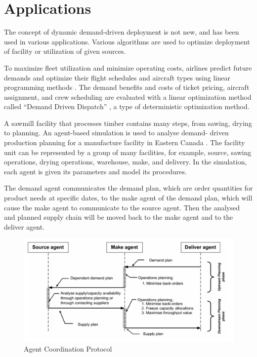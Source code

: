 \section{Applications}
The concept of dynamic demand-driven deployment is not new,
and has been used in various applications. Various algorithms
are used to optimize deployment of facility or utilization
of given sources.

To maximize fleet utilization and minimize
operating costs, airlines predict future demands
and optimize their flight schedules and aircraft
types using linear programming methods \cite{berge_demand_1993}. The demand
benefits and costs of ticket pricing, aircraft assignment, and crew 
scheduling are evaluated with a linear optimization method called
 ``Demand Driven Dispatch'' \cite{shebalov_practical_2009}, a type
of deterministic optimization method.

A sawmill facility that processes timber contains 
many steps, from sawing, drying to planning. An
agent-based simulation is used to analyse demand-
driven production planning for a manufacture facility
in Eastern Canada \cite{yanez_agent-based_2009}.
The facility unit can be represented by a group of many facilities,
for example, source, sawing operations, drying operations, warehouse,
make, and delivery. In the simulation, each agent is given its parameters
and model its procedures.

The demand agent communicates the demand plan, which are
order quantities for product needs at specific dates,
to the make agent of the demand plan,
which will cause the make agent to communicate to the source agent. Then the
analysed and planned supply chain will be moved back to the make agent and
to the deliver agent.

\begin{figure}
	\includegraphics[width=\textwidth]{./images/timber_process.png}
	\caption{Agent Coordination Protocol \cite{yanez_agent-based_2009} } 
	\label{fig:timber_process}
\end{figure}


